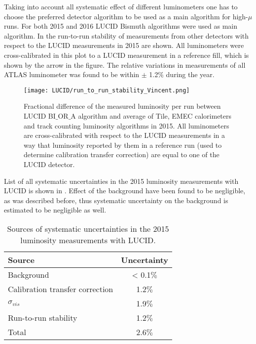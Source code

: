 Taking into account all systematic effect of different luminometers one has to choose the preferred detector algorithm to be used as a main algorithm for high-$\mu$ runs.
For both 2015 and 2016 LUCID Bismuth algorithms were used as main algorithm. 
In  the run-to-run stability of measurements from other detectors with respect to the LUCID measurements in 2015 are shown. 
All luminometers were cross-calibrated in this plot to a LUCID measurement in a reference fill, which is shown by the arrow in the figure.
The relative variations in measurements of all ATLAS luminometer was found to be within $\pm$ 1.2$\%$ during the year.
\begin{figure}
\centering
\texttt{[image: LUCID/run\_to\_run\_stability\_Vincent.png]}
\caption{
Fractional difference of the measured luminosity per run between LUCID BI$\_$OR$\_$A algorithm and average of Tile, EMEC calorimeters and track counting luminosity algorithms in 2015.
All luminometers are cross-calibrated with respect to the LUCID measurements in a way that luminosity reported by them in a reference run (used to determine calibration transfer correction) are
equal to one of the LUCID detector.
}
\label{fig:runByRunStability}
\end{figure}

List of all systematic uncertainties in the 2015 luminosity measurements with LUCID is shown in .
Effect of the background have been found to be negligible, as was described before, thus systematic uncertainty on the background is estimated to be 
negligible as well.

\begin{table}[bp]
  \begin{tabular}{l|c}
    Source & Uncertainty \\
    \hline
    Background		&	< 0.1$\%$ \\
    \hline
    Calibration transfer correction	&	1.2$\%$ \\
    \hline
    $\sigma_{vis}$	&	1.9$\%$ \\
    \hline
    Run-to-run stability	&	1.2$\%$ \\
    \hline
    \hline
    Total 	&	2.6$\%$ \\
  \end{tabular}
  \caption{Sources of systematic uncertainties in the 2015 luminosity measurements with LUCID.}
  \label{tab:lucid_syst_errors}
\end{table}

